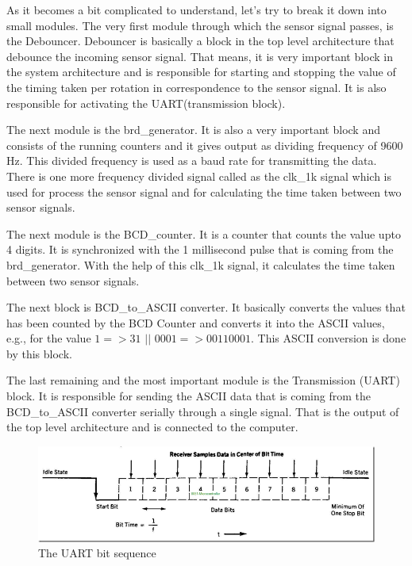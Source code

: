 \documentclass[12pt,a4paper]{article}
\begin{document}
As it becomes a bit complicated to understand, let’s try to break it down into small modules. The very first module through which the sensor signal passes, is the Debouncer. Debouncer is basically a block in the top level architecture that debounce the incoming sensor signal. That means, it is very important block in the system architecture and is responsible for starting and stopping the value of the timing taken per rotation in correspondence to the sensor signal. It is also responsible for activating the UART(transmission block).\
 
The next module is the brd\_generator. It is also a very important block and consists of the running counters and it gives output as dividing frequency of 9600 Hz. This divided frequency is used as a baud rate for transmitting the data. There is one more frequency divided signal called as the clk\_1k signal which is used for process the sensor signal and for calculating the time taken between two sensor signals.\

The next module is the BCD\_counter. It is a counter that counts the value upto 4 digits. It is synchronized with the 1 millisecond pulse that is coming from the brd\_generator.  With the help of this clk\_1k signal, it calculates the time taken between two sensor signals.\

The next block is BCD\_to\_ASCII converter. It basically converts the values that has been counted by the BCD Counter and converts it into the ASCII values, e.g., for the value $1 => 31$ $||$ $0001 => 00110001$. This ASCII conversion is done by this block.

The last remaining and the most important module is the Transmission (UART) block. It is responsible for sending the ASCII data that is coming from the BCD\_to\_ASCII converter serially through a single signal. That is the output of the top level architecture and is connected to the computer.
\begin{figure}[H]
\centering
\includegraphics[width=\linewidth]{urattime.png}
\caption{The UART bit sequence }
\label{the UART bit sequence }
\end{figure}
\end{document}
